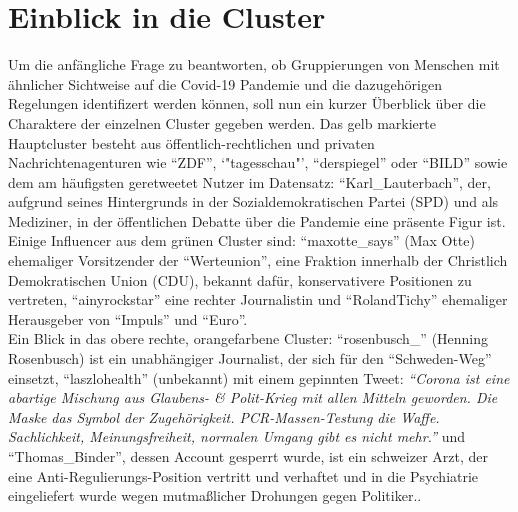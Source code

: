 \section{Einblick in die Cluster}
Um die anfängliche Frage zu beantworten, ob Gruppierungen von Menschen mit ähnlicher Sichtweise auf die Covid-19 Pandemie und die dazugehörigen Regelungen identifizert werden können, soll nun ein kurzer Überblick über die Charaktere der einzelnen Cluster gegeben werden.
Das gelb markierte Hauptcluster besteht aus öffentlich-rechtlichen und privaten Nachrichtenagenturen wie "`ZDF"', `"tagesschau"', "`derspiegel"' oder "`BILD"' sowie dem am häufigsten \gls{geretweetet} Nutzer im Datensatz: "`Karl\_Lauterbach"', der, aufgrund seines Hintergrunds in der Sozialdemokratischen Partei (SPD) und als Mediziner, in der öffentlichen Debatte über die Pandemie eine präsente Figur ist.\\
Einige Influencer aus dem grünen Cluster sind: "`maxotte\_says"' (Max Otte) ehemaliger Vorsitzender der "`Werteunion"', eine Fraktion innerhalb der Christlich Demokratischen Union (CDU), bekannt dafür, konservativere Positionen zu vertreten, "`ainyrockstar"' eine rechter Journalistin \cite{schunke} und "`RolandTichy"' ehemaliger Herausgeber von "`Impuls"' und "`Euro"'.\\
Ein Blick in das obere rechte, orangefarbene Cluster:
"`rosenbusch\_"' (Henning Rosenbusch) ist ein unabhängiger Journalist, der sich für den "`Schweden-Weg"' einsetzt,
"`laszlohealth"' (unbekannt) mit einem gepinnten Tweet: \textit{"`Corona ist eine abartige Mischung aus Glaubens- \& Polit-Krieg mit allen Mitteln geworden. Die Maske das Symbol der Zugehörigkeit. PCR-Massen-Testung die Waffe. Sachlichkeit, Meinungsfreiheit, normalen Umgang gibt es nicht mehr."'}\cite{laszlo} und "`Thomas\_Binder"', dessen Account gesperrt wurde, ist ein schweizer Arzt, der eine Anti-Regulierungs-Position vertritt und verhaftet und in die Psychiatrie eingeliefert wurde wegen mutmaßlicher Drohungen gegen Politiker.\cite{Thomas}.









